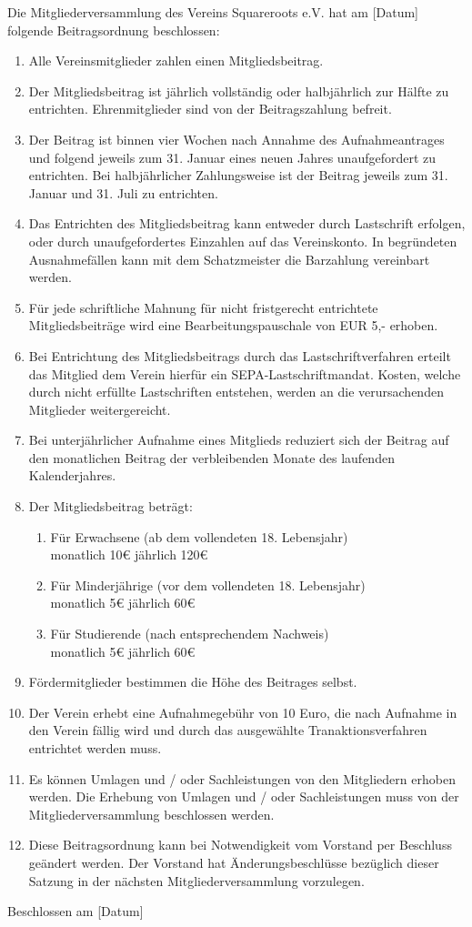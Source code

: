\documentclass[a4paper,ngerman]{scrartcl}
\begin{document}
Die Mitgliederversammlung des Vereins Squareroots e.V. hat am [Datum] folgende Beitragsordnung beschlossen:

\begin{enumerate}
\item Alle Vereinsmitglieder zahlen einen Mitgliedsbeitrag.
\item Der Mitgliedsbeitrag ist jährlich vollständig oder halbjährlich zur Hälfte zu entrichten. Ehrenmitglieder sind von der Beitragszahlung befreit.
\item Der Beitrag ist binnen vier Wochen nach Annahme des Aufnahmeantrages und folgend jeweils zum 31. Januar eines neuen Jahres unaufgefordert zu entrichten. Bei halbjährlicher Zahlungsweise ist der Beitrag jeweils zum 31. Januar und 31. Juli zu entrichten.
\item Das Entrichten des Mitgliedsbeitrag kann entweder durch Lastschrift erfolgen, oder durch unaufgefordertes Einzahlen auf das Vereinskonto. In begründeten Ausnahmefällen kann mit dem Schatzmeister die Barzahlung vereinbart werden.
\item Für jede schriftliche Mahnung für nicht fristgerecht entrichtete Mitgliedsbeiträge wird eine Bearbeitungspauschale von EUR 5,- erhoben.
\item Bei Entrichtung des Mitgliedsbeitrags durch das Lastschriftverfahren erteilt das Mitglied dem Verein hierfür ein SEPA-Lastschriftmandat. Kosten, welche durch nicht erfüllte Lastschriften entstehen, werden an die verursachenden Mitglieder weitergereicht.
\item Bei unterjährlicher Aufnahme eines Mitglieds reduziert sich der Beitrag auf den monatlichen Beitrag der verbleibenden Monate des laufenden Kalenderjahres.
\item Der Mitgliedsbeitrag beträgt:
\begin{enumerate}
\item Für Erwachsene (ab dem vollendeten 18. Lebensjahr)\\
monatlich 10€          jährlich 120€
\item Für Minderjährige (vor dem vollendeten 18. Lebensjahr)\\
monatlich 5€            jährlich 60€
\item Für Studierende (nach entsprechendem Nachweis)\\
monatlich 5€            jährlich 60€
\end{enumerate}
\item Fördermitglieder bestimmen die Höhe des Beitrages selbst.
\item Der Verein erhebt eine Aufnahmegebühr von 10 Euro, die nach Aufnahme in den Verein fällig wird und durch das ausgewählte Tranaktionsverfahren entrichtet werden muss.
\item Es können Umlagen und / oder Sachleistungen von den Mitgliedern erhoben werden. Die Erhebung von Umlagen und / oder Sachleistungen muss von der Mitgliederversammlung beschlossen werden.
\item Diese Beitragsordnung kann bei Notwendigkeit vom Vorstand per Beschluss geändert werden. Der Vorstand hat Änderungsbeschlüsse bezüglich dieser Satzung in der nächsten Mitgliederversammlung vorzulegen.
\end{enumerate}


Beschlossen am [Datum]
\end{document}
